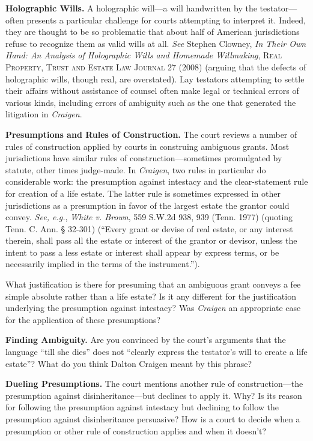 
\item \textbf{Holographic Wills.} A holographic will---a will handwritten by the
testator---often presents a particular challenge for courts attempting to
interpret it. Indeed, they are thought to be so problematic that about half of
American jurisdictions refuse to recognize them as valid wills at all.
\textit{See} Stephen Clowney, \textit{In Their Own Hand: An Analysis of
Holographic Wills and Homemade Willmaking}, \textsc{Real Property, Trust and
Estate Law Journal 27} (2008) (arguing that the defects of holographic wills,
though real, are overstated). Lay testators attempting to settle their affairs
without assistance of counsel often make legal or technical errors of various
kinds, including errors of ambiguity such as the one that generated the
litigation in \textit{Craigen}.


\item \textbf{Presumptions and Rules of Construction.} The court reviews a
number of rules of construction applied by courts in construing ambiguous
grants. Most jurisdictions have similar rules of construction---sometimes
promulgated by statute, other times judge-made. In \textit{Craigen}, two rules
in particular do considerable work: the presumption against intestacy and the
clear-statement rule for creation of a life estate. The latter rule is
sometimes expressed in other jurisdictions as a presumption in favor of the
largest estate the grantor could convey. \textit{See, e.g.}, \textit{White v.
Brown}, 559 S.W.2d 938, 939 (Tenn. 1977) (quoting Tenn. C. Ann. {\S} 32-301)
(``Every grant or devise of real estate, or any interest therein, shall pass
all the estate or interest of the grantor or devisor, unless the intent to pass
a less estate or interest shall appear by express terms, or be necessarily
implied in the terms of the instrument.'').


What justification is there for presuming that an ambiguous grant conveys a fee
simple absolute rather than a life estate? Is it any different for the
justification underlying the presumption against intestacy? Was
\textit{Craigen} an appropriate case for the application of these presumptions?



\item \textbf{Finding Ambiguity.} Are you convinced by the court's arguments
that the language ``till she dies'' does not ``clearly express the testator's
will to create a life estate''? What do you think Dalton Craigen meant by this
phrase?


\item \textbf{Dueling Presumptions.} The court mentions another rule of
construction---the presumption against disinheritance---but declines to apply
it. Why? Is its reason for following the presumption against intestacy but
declining to follow the presumption against disinheritance persuasive? How is a
court to decide when a presumption or other rule of construction applies and
when it doesn't?

